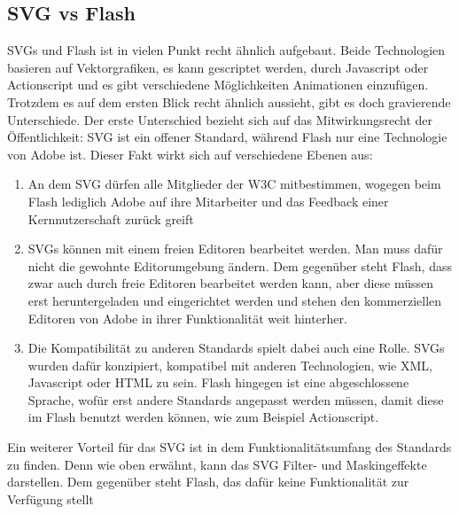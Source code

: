 \subsection{SVG vs Flash}
SVGs und Flash ist in vielen Punkt recht ähnlich aufgebaut. Beide Technologien basieren auf Vektorgrafiken, es kann gescriptet werden, durch Javascript oder Actionscript und es gibt verschiedene Möglichkeiten Animationen einzufügen.\\
Trotzdem es auf dem ersten Blick recht ähnlich aussieht, gibt es doch gravierende Unterschiede. Der erste Unterschied bezieht sich auf das Mitwirkungsrecht der Öffentlichkeit: SVG ist ein offener Standard, während Flash nur eine Technologie von Adobe ist. Dieser Fakt wirkt sich auf verschiedene Ebenen aus:
\begin{enumerate}
  \item An dem SVG dürfen alle Mitglieder der W3C mitbestimmen, wogegen beim Flash lediglich Adobe auf ihre Mitarbeiter und das Feedback einer Kernnutzerschaft zurück greift
  \item SVGs können mit einem freien Editoren bearbeitet werden. Man muss dafür nicht die gewohnte Editorumgebung ändern. Dem gegenüber steht Flash, dass zwar auch durch freie Editoren bearbeitet werden kann, aber diese müssen erst heruntergeladen und eingerichtet werden und stehen den kommerziellen Editoren von Adobe in ihrer Funktionalität weit hinterher.
  \item Die Kompatibilität zu anderen Standards spielt dabei auch eine Rolle. SVGs wurden dafür konzipiert, kompatibel mit anderen Technologien, wie XML, Javascript oder HTML zu sein. Flash hingegen ist eine abgeschlossene Sprache, wofür erst andere Standards angepasst werden müssen, damit diese im Flash benutzt werden können, wie zum Beispiel Actionscript.
\end{enumerate}
Ein weiterer Vorteil für das SVG ist in dem Funktionalitätsumfang des Standards zu finden. Denn wie oben erwähnt, kann das SVG Filter- und Maskingeffekte darstellen. Dem gegenüber steht Flash, das dafür keine Funktionalität zur Verfügung stellt
